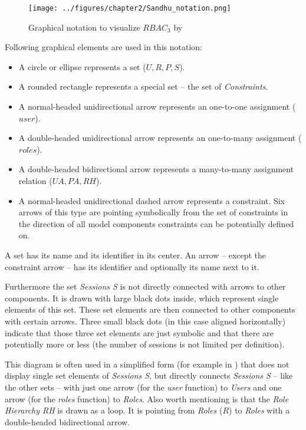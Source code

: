 \documentclass[twoside, openright, 12pt]{book}
\begin{document}
\begin{figure}[htb]
	\centering
	\texttt{[image: ../figures/chapter2/Sandhu\_notation.png]}
	\caption{Graphical notation to visualize $RBAC_3$ by \cite{Sandhu96} }
	\label{fig:Sandhu_notation}
\end{figure}

\noindent
Following graphical elements are used in this notation:

\begin{itemize}
\item A circle or ellipse represents a set ($U, R, P, S$).
\item A rounded rectangle represents a special set -- the set of \textit{Constraints}.
\item A normal-headed unidirectional arrow represents an one-to-one assignment ($\mathit{user}$).
\item A double-headed unidirectional arrow represents an one-to-many assignment ($\mathit{roles}$).
\item A double-headed bidirectional arrow represents a many-to-many assignment relation ($\mathit{UA}, \mathit{PA}, \mathit{RH}$).
\item A normal-headed unidirectional dashed arrow represents a constraint.
Six arrows of this type are pointing symbolically from the set of constraints in the direction of all model components constraints can be potentially defined on.
\end{itemize}

\noindent
A set has its name and its identifier in its center.
An arrow -- except the constraint arrow -- has its identifier and optionally its name next to it.

Furthermore the set \textit{Sessions S} is not directly connected with arrows to other components.
It is drawn with large black dots inside, which represent single elements of this set.
These set elements are then connected to other components with certain arrows.
Three small black dots (in this case aligned horizontally) indicate that those three set elements are just symbolic and that there are potentially more or less (the number of sessions is not limited per definition).

This diagram is often used in a simplified form (for example in \citep{Amthor18}) that does not display single set elements of \textit{Sessions S}, but directly connects \textit{Sessions S} -- like the other sets -- with just one arrow (for the \textit{user} function) to \textit{Users} and one arrow (for the \textit{roles} function) to \textit{Roles}.
Also worth mentioning is that the \textit{Role Hierarchy RH} is drawn as a loop. 
It is pointing from \textit{Roles} ($R$) to \textit{Roles} with a double-headed bidirectional arrow.
\end{document}
